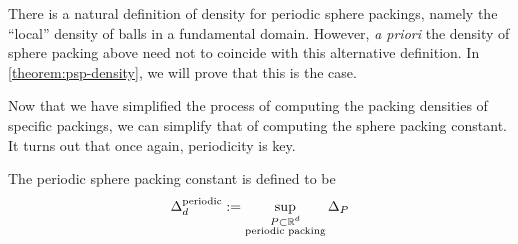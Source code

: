 There is a natural definition of density for periodic sphere packings, namely the ``local'' density of balls in a fundamental domain. However, \textit{a priori} the density of sphere packing above need not to coincide with this alternative definition. In \cref{theorem:psp-density}, we will prove that this is the case.

Now that we have simplified the process of computing the packing densities of specific packings, we can simplify that of computing the sphere packing constant. It turns out that once again, periodicity is key.

\begin{definition}\label{def:Periodic-sphere-packing-constant}\leanok
    The periodic sphere packing constant is defined to be
    $$ \Delta_{d}^{\text{periodic}} := \sup_{\substack{P \subset \mathbb{R}^d \\ \text{periodic packing}}} \Delta_P$$
\end{definition}

